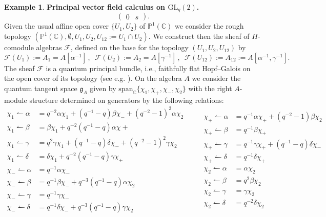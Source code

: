 \documentclass{article}
\theoremstyle{definition}
\newtheorem{example}[thm]{Example}
\newcommand{\C}{{\mathbb{C}}}
\newcommand{\bP}{{\mathbb{P}}}
\newcommand{\cF}{{\mathcal{F}}}
\begin{document}
{\begin{example} {\bf Principal vector field calculus on $\mathrm{GL}_q(2)$.}
$$\begin{pmatrix}
		0 & s
	\end{pmatrix}.
	$$		
	Given the usual affine open cover
	$\{U_1,U_2\}$ of $\bP^1(\C)$ we consider the rough topology  $(\bP^1(\C),\emptyset, U_1,U_2,U_{12}:=U_1\cap U_2)$. We construct then the sheaf of $H$-comodule algebras $\cF$, defined on the base for the topology $(U_1,U_2,U_{12})$ by
	$$
	\cF(U_1):=A_1=A[\alpha^{-1}]\,,\,\,\,\cF(U_2):=A_2=A[\gamma^{-1}]\,,\,\,\,\cF(U_{12}):=A_{12}:=A[\alpha^{-1},\gamma^{-1}].
	$$
	The sheaf $\mathcal{F}$ is a quantum principal bundle, i.e., faithfully flat Hopf--Galois on the open cover of its topology (see e.g. \cite[Section 4.5.3]{aflw}).
	On the algebra $A$ we consider the quantum tangent space $\mathfrak{g}_A$ given by $\mathrm{span}_\mathbb{C}\{\chi_1,\chi_+,\chi_-,\chi_2\}$ with the right $A$-module structure determined on generators by the following relations: 
	\begin{equation*}
		\begin{split}
			\chi_1\leftharpoonup \alpha
			&=q^{-2} \alpha \chi_1 +(q^{-1}-q) \beta\chi_-+(q^{-2}-1)^2\alpha 
			\chi_2\\
			\chi_1\leftharpoonup \beta
			&=\beta\chi_1+q^{-2}(q^{-1}-q)\alpha\chi+\\
			\chi_1\leftharpoonup \gamma
			&=q^{2} \gamma \chi_1 +(q^{-1}-q) \delta\chi_-+(q^{-2}-1)^2\gamma 
			\chi_2\\
			\chi_1\leftharpoonup \delta&=\delta \chi_1+q^{-2}(q^{-1}-q)\gamma\chi_+\\
			\chi_-\leftharpoonup \alpha
			&=q^{-1} \alpha \chi_-\\
			\chi_-\leftharpoonup \beta
			&=q^{-1}\beta\chi_{-}+q^{-3}(q^{-1}-q)\alpha\chi_2\\
			\chi_-\leftharpoonup \gamma
			&=q^{-1} \gamma \chi_- \\
			\chi_-\leftharpoonup \delta&=q^{-1}\delta \chi_-+q^{-3}(q^{-1}-q)\gamma\chi_2
		\end{split}\qquad
		\begin{split}
			\chi_+\leftharpoonup\alpha
			&=q^{-1}\alpha\chi_++(q^{-2}-1)\beta\chi_2\\
			\chi_+\leftharpoonup \beta
			&=q^{-1}\beta \chi_+   \\
			\chi_+\leftharpoonup \gamma
			&=q^{-1}\gamma\chi_++(q^{-1}-q)\delta\chi_-\\
			\chi_+\leftharpoonup \delta
			&=q^{-1}\delta\chi_+\\
			\chi_2\leftharpoonup \alpha
			&=\alpha \chi_2\\
			\chi_2\leftharpoonup \beta
			&=q^2\beta\chi_2\\
			\chi_2\leftharpoonup \gamma
			&=\gamma \chi_2\\
			\chi_2\leftharpoonup \delta&=q^{-2}\delta \chi_2
		\end{split}
	\end{equation*}
	

\end{example}}
\end{document}
